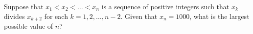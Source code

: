 Suppose that $x_1 < x_2 < \dots < x_n$ is a sequence of positive integers such that $x_k$ divides $x_{k+2}$ for each $k = 1, 2, \dots, n-2$.  Given that $x_n = 1000$, what is the largest possible value of $n$?
